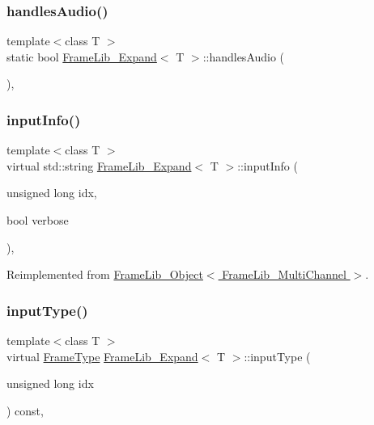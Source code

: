 \subsubsection{\texorpdfstring{handles\+Audio()}{handlesAudio()}}
{\footnotesize\ttfamily template$<$class T $>$ \\
static bool \hyperlink{class_frame_lib___expand}{Frame\+Lib\+\_\+\+Expand}$<$ T $>$\+::handles\+Audio (\begin{DoxyParamCaption}{ }\end{DoxyParamCaption})\hspace{0.3cm}{\ttfamily [inline]}, {\ttfamily [static]}}

\mbox{\label{class_frame_lib___expand_ab9017c7fe8562857609fcf819b7d1cdd}} 
\subsubsection{\texorpdfstring{input\+Info()}{inputInfo()}}
{\footnotesize\ttfamily template$<$class T $>$ \\
virtual std\+::string \hyperlink{class_frame_lib___expand}{Frame\+Lib\+\_\+\+Expand}$<$ T $>$\+::input\+Info (\begin{DoxyParamCaption}\item[{unsigned long}]{idx,  }\item[{bool}]{verbose }\end{DoxyParamCaption})\hspace{0.3cm}{\ttfamily [inline]}, {\ttfamily [virtual]}}



Reimplemented from \hyperlink{class_frame_lib___object_a49abea5f18125c425b1eae8710735891}{Frame\+Lib\+\_\+\+Object$<$ Frame\+Lib\+\_\+\+Multi\+Channel $>$}.

\mbox{\label{class_frame_lib___expand_abfe5f5550062e7cb351d45111dd2958c}} 
\subsubsection{\texorpdfstring{input\+Type()}{inputType()}}
{\footnotesize\ttfamily template$<$class T $>$ \\
virtual \hyperlink{_frame_lib___types_8h_ad495a9f61af7fff07d7e97979d1ab854}{Frame\+Type} \hyperlink{class_frame_lib___expand}{Frame\+Lib\+\_\+\+Expand}$<$ T $>$\+::input\+Type (\begin{DoxyParamCaption}\item[{unsigned long}]{idx }\end{DoxyParamCaption}) const\hspace{0.3cm}{\ttfamily [inline]}, {\ttfamily [virtual]}}



